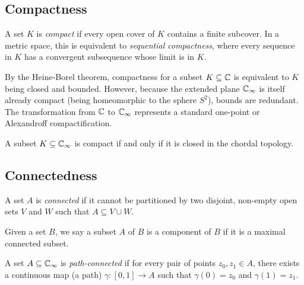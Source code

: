 \subsection*{Compactness}

\begin{definition*}
    A set $K$ is \emph{compact} if every open cover of $K$ contains a finite
    subcover. In a metric space, this is equivalent to \emph{sequential
    compactness}, where every sequence in $K$ has a convergent subsequence whose
    limit is in $K$.
\end{definition*}

By the Heine-Borel theorem, compactness for a subset $K \subseteq \mathbb{C}$ is
equivalent to $K$ being closed and bounded. However, because the extended plane
$\mathbb{C}_\infty$ is itself already compact (being homeomorphic to the sphere $S^2$),
bounds are redundant. The transformation from $\mathbb{C}$ to $\mathbb{C}_\infty$ represents a
standard one-point or Alexandroff compactification.

\begin{definition*}
    A subset $K \subseteq \mathbb{C}_\infty$ is compact if and only if it is closed in the
    chordal topology.
\end{definition*}

\subsection*{Connectedness}

\begin{definition*}
    A set $A$ is \emph{connected} if it cannot be partitioned by two disjoint,
    non-empty open sets $V$ and $W$ such that $A \subseteq V \cup W$.
\end{definition*}

\begin{definition*}
    Given a set $B$, we say a subset $A$ of $B$ is a component of $B$ if it is a
    maximal connected subset.
\end{definition*}

\begin{definition*}
    A set $A \subseteq \mathbb{C}_\infty$ is \emph{path-connected} if for every pair of
    points $z_0, z_1 \in A$, there exists a continuous map (a path) $\gamma: [0,
    1] \to A$ such that $\gamma(0) = z_0$ and $\gamma(1) = z_1$.
\end{definition*}


